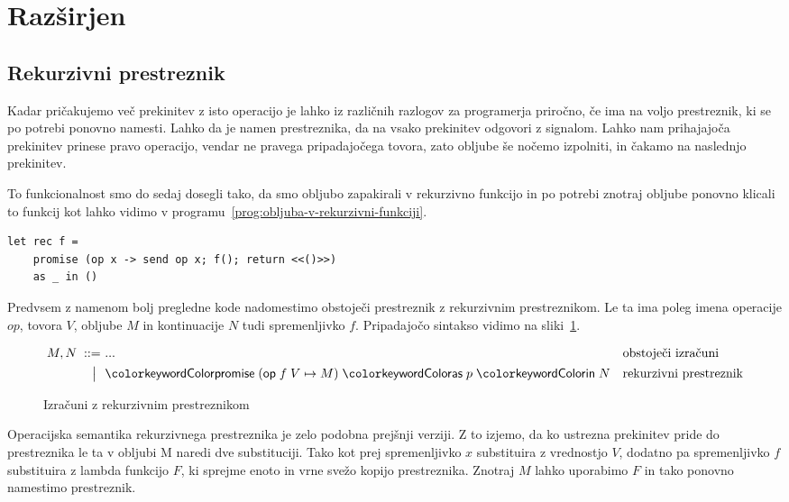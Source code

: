 \section{Razširjen \lae{}}\label{sec:razsirjen-lae}



\subsection{Rekurzivni prestreznik}



Kadar pričakujemo več prekinitev z isto operacijo je lahko iz različnih razlogov za programerja priročno, če ima na voljo prestreznik, ki se po potrebi ponovno namesti. Lahko da je namen prestreznika, da na vsako prekinitev odgovori z signalom. Lahko nam prihajajoča prekinitev prinese pravo operacijo, vendar ne pravega pripadajočega tovora, zato obljube še nočemo izpolniti, in čakamo na naslednjo prekinitev.

To funkcionalnost smo do sedaj dosegli tako, da smo obljubo zapakirali v rekurzivno funkcijo in po potrebi znotraj obljube ponovno klicali to funkcij kot lahko vidimo v programu~\ref{prog:obljuba-v-rekurzivni-funkciji}.


\begin{lstlisting}[caption={Obljuba v rekurzivni funkciji.},label={prog:obljuba-v-rekurzivni-funkciji}]
	let rec f =
	promise (op x -> send op x; f(); return <<()>>) 
	as _ in ()
\end{lstlisting}

Predvsem z namenom bolj pregledne kode nadomestimo obstoječi prestreznik z rekurzivnim prestreznikom. Le ta ima poleg imena operacije $op$, tovora $V$, obljube $M$ in kontinuacije $N$ tudi spremenljivko $f$. Pripadajočo sintakso vidimo na sliki~\ref{fig:izrazi-prestreznik}.


\begin{figure}[h]
	\centering
	\small
	\begin{align*}
	M, N
	\bnfis& ...                            & &\text{obstoječi izračuni} \\
	\bnfor& \tmwithrec{op}{f}{V}{M}{p}{N}  & &\text{rekurzivni prestreznik}
	\end{align*}
 
	\caption{Izračuni z rekurzivnim prestreznikom}
	\label{fig:izrazi-prestreznik}
\end{figure}


Operacijska semantika rekurzivnega prestreznika je zelo podobna prejšnji verziji. Z to izjemo, da ko ustrezna prekinitev pride do prestreznika le ta v obljubi M naredi dve substituciji. Tako kot prej spremenljivko $x$ substituira z vrednostjo $V$, dodatno pa spremenljivko $f$ substituira z lambda funkcijo $F$, ki sprejme enoto in vrne svežo kopijo prestreznika. Znotraj $M$ lahko uporabimo $F$ in tako ponovno namestimo prestreznik.   


